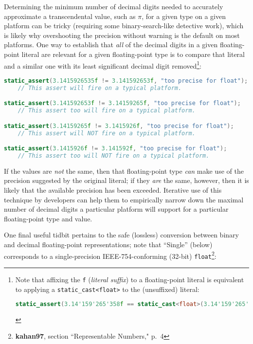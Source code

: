 Determining the minimum number of decimal digits needed to accurately
approximate a transcendental value, such as $\pi$, for a given type on
a given platform can be tricky (requiring some binary-search-like
detective work), which is likely why overshooting the precision without
warning is the default on most platforms. One way to establish that
\emph{all} of the decimal digits in a given floating-point literal are
relevant for a given floating-point type is to compare that literal and
a similar one with its least significant decimal digit
removed{\cprotect\footnote{Note that affixing the \texttt{f}
(\emph{literal suffix}) to a floating-point literal is
equivalent to applying a \texttt{static\_cast<float>} to the
(unsuffixed) literal:

\begin{lstlisting}[language=C++, basicstyle={\ttfamily\footnotesize}]
static_assert(3.14'159'265'358f == static_cast<float>(3.14'159'265'358));
\end{lstlisting}\vspace*{-1ex}
      }}:

\begin{lstlisting}[language=C++]
static_assert(3.1415926535f != 3.141592653f, "too precise for float");
    // This assert will fire on a typical platform.

static_assert(3.141592653f != 3.14159265f, "too precise for float");
    // This assert too will fire on a typical platform.

static_assert(3.14159265f != 3.1415926f, "too precise for float");
    // This assert will NOT fire on a typical platform.

static_assert(3.1415926f != 3.141592f, "too precise for float");
    // This assert too will NOT fire on a typical platform.
\end{lstlisting}
    
\noindent If the values are \emph{not} the same, then that floating-point type
\emph{can} make use of the precision suggested by the original literal; if
they \emph{are} the same, however, then it is likely that the available
precision has been exceeded. Iterative use of this technique by
developers can help them to empirically narrow down the maximal number
of decimal digits a particular platform will support for a particular
floating-point type and value.

One final useful tidbit pertains to the safe (lossless) conversion
between binary and decimal floating-point representations; note that
``Single'' (below) corresponds to a single-precision IEEE-754-conforming
(32-bit) \texttt{float}{\cprotect\footnote{\textbf{kahan97}, section ``Representable Numbers," p.~4}}:

